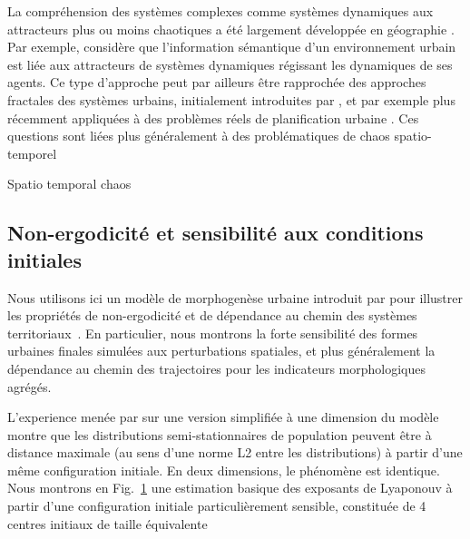 \documentclass[11pt]{article}
\begin{document}
La compréhension des systèmes complexes comme systèmes dynamiques aux attracteurs plus ou moins chaotiques a été largement développée en géographie \citep{dauphine1995chaos}. Par exemple, \cite{e18060197} considère que l'information sémantique d'un environnement urbain est liée aux attracteurs de systèmes dynamiques régissant les dynamiques de ses agents. Ce type d'approche peut par ailleurs être rapprochée des approches fractales des systèmes urbains, initialement introduites par \cite{batty1994fractal}, et par exemple plus récemment appliquées à des problèmes réels de planification urbaine \citep{yamu2015spatial}. Ces questions sont liées plus généralement à des problématiques de chaos spatio-temporel \citep{crutchfield1987phenomenology}

Spatio temporal chaos

\cite{chen2009urban}


\subsection{Non-ergodicité et sensibilité aux conditions initiales}

Nous utilisons ici un modèle de morphogenèse urbaine introduit par \cite{raimbault2018calibration} pour illustrer les propriétés de non-ergodicité et de dépendance au chemin des systèmes territoriaux~\citep{pumain2012urban}. En particulier, nous montrons la forte sensibilité des formes urbaines finales simulées aux perturbations spatiales, et plus généralement la dépendance au chemin des trajectoires pour les indicateurs morphologiques agrégés.

L'experience menée par \cite{raimbault2018calibration} sur une version simplifiée à une dimension du modèle montre que les distributions semi-stationnaires de population peuvent être à distance maximale (au sens d'une norme L2 entre les distributions) à partir d'une même configuration initiale. En deux dimensions, le phénomène est identique. Nous montrons en Fig.~\ref{fig:lyapounov} une estimation basique des exposants de Lyaponouv à partir d'une configuration initiale particulièrement sensible, constituée de 4 centres initiaux de taille équivalente


\begin{figure}
	
	\caption{}
	\label{fig:lyapounov}
\end{figure}
\end{document}
